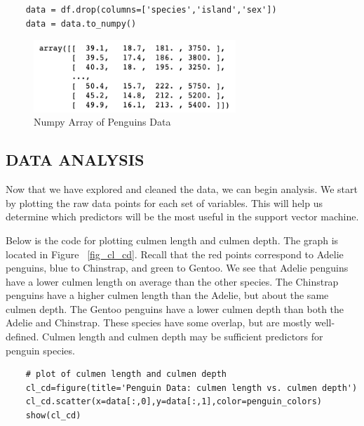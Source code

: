 \documentclass[12pt]{article}
\begin{document}
\begin{verbatim}
    data = df.drop(columns=['species','island','sex'])
    data = data.to_numpy()
\end{verbatim}

\begin{figure}[H]
    \centering
    \includegraphics[width=3in]{Figures/penguins/penguins_numpy_data.png}
    \caption{Numpy Array of Penguins Data}
    \label{fig_penguins_numpy}
\end{figure}

\subsection{DATA ANALYSIS}

Now that we have explored and cleaned the data, we can begin analysis. We start by plotting the raw data points for each set of variables. This will help us determine which predictors will be the most useful in the support vector machine.

Below is the code for plotting culmen length and culmen depth. The graph is located in Figure ~\ref{fig_cl_cd}. Recall that the red points correspond to Adelie penguins, blue to Chinstrap, and green to Gentoo. We see that Adelie penguins have a lower culmen length on average than the other species. The Chinstrap penguins have a higher culmen length than the Adelie, but about the same culmen depth. The Gentoo penguins have a lower culmen depth than both the Adelie and Chinstrap. These species have some overlap, but are mostly well-defined. Culmen length and culmen depth may be sufficient predictors for penguin species.

\begin{verbatim}
    # plot of culmen length and culmen depth
    cl_cd=figure(title='Penguin Data: culmen length vs. culmen depth')
    cl_cd.scatter(x=data[:,0],y=data[:,1],color=penguin_colors)
    show(cl_cd)
\end{verbatim}
\end{document}
